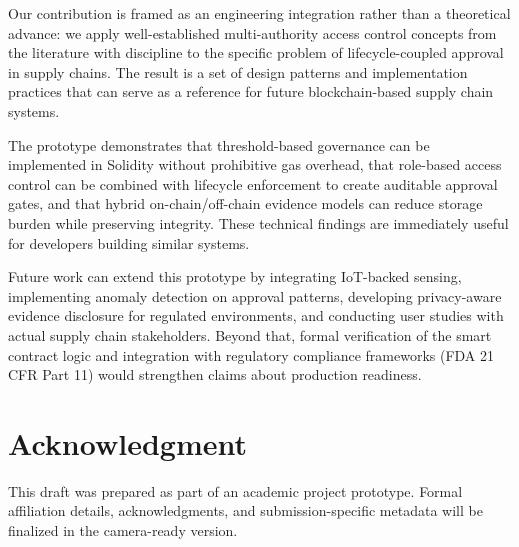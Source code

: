 \documentclass[conference]{IEEEtran}
\begin{document}
Our contribution is framed as an engineering integration rather than a theoretical advance: we apply well-established multi-authority access control concepts from the literature with discipline to the specific problem of lifecycle-coupled approval in supply chains. The result is a set of design patterns and implementation practices that can serve as a reference for future blockchain-based supply chain systems.

The prototype demonstrates that threshold-based governance can be implemented in Solidity without prohibitive gas overhead, that role-based access control can be combined with lifecycle enforcement to create auditable approval gates, and that hybrid on-chain/off-chain evidence models can reduce storage burden while preserving integrity. These technical findings are immediately useful for developers building similar systems.

Future work can extend this prototype by integrating IoT-backed sensing, implementing anomaly detection on approval patterns, developing privacy-aware evidence disclosure for regulated environments, and conducting user studies with actual supply chain stakeholders. Beyond that, formal verification of the smart contract logic and integration with regulatory compliance frameworks (FDA 21 CFR Part 11) would strengthen claims about production readiness.

\section*{Acknowledgment}

This draft was prepared as part of an academic project prototype. Formal affiliation details, acknowledgments, and submission-specific metadata will be finalized in the camera-ready version.
\end{document}
